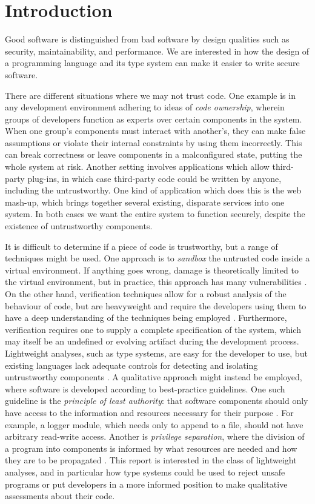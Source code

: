 \chapter{Introduction}\label{C:intro}

Good software is distinguished from bad software by design qualities such as security, maintainability, and performance. We are interested in how the design of a programming language and its type system can make it easier to write secure software.

There are different situations where we may not trust code. One example is in any development environment adhering to ideas of \textit{code ownership}, wherein groups of developers function as experts over certain components in the system. When one group's components must interact with another's, they can make false assumptions or violate their internal constraints by using them incorrectly. This can break correctness or leave components in a malconfigured state, putting the whole system at risk.  Another setting involves applications which allow third-party plug-ins, in which case third-party code could be written by anyone, including the untrustworthy. One kind of application which does this is the web mash-up, which brings together several existing, disparate services into one system. In both cases we want the entire system to function securely, despite the existence of untrustworthy components.

It is difficult to determine if a piece of code is trustworthy, but a range of techniques might be used. One approach is to \textit{sandbox} the untrusted code inside a virtual environment. If anything goes wrong, damage is theoretically limited to the virtual environment, but in practice, this approach has many vulnerabilities \cite{coker15, maass16, watson07, schreuders13}. On the other hand, verification techniques allow for a robust analysis of the behaviour of code, but are heavyweight and require the developers using them to have a deep understanding of the techniques being employed \cite{kneuper97}. Furthermore, verification requires one to supply a complete specification of the system, which may itself be an undefined or evolving artifact during the development process. Lightweight analyses, such as type systems, are easy for the developer to use, but existing languages lack adequate controls for detecting and isolating untrustworthy components \cite{chen07, ter-louw08}. A qualitative approach might instead be employed, where software is developed according to best-practice guidelines. One such guideline is the \textit{principle of least authority}: that software components should only have access to the information and resources necessary for their purpose \cite{saltzer74}. For example, a logger module, which needs only to append to a file, should not have arbitrary read-write access. Another is \textit{privilege separation}, where the division of a program into components is informed by what resources are needed and how they are to be propagated \cite{saltzer75}. This report is interested in the class of lightweight analyses, and in particular how type systems could be used to reject unsafe programs or put developers in a more informed position to make qualitative assessments about their code.

